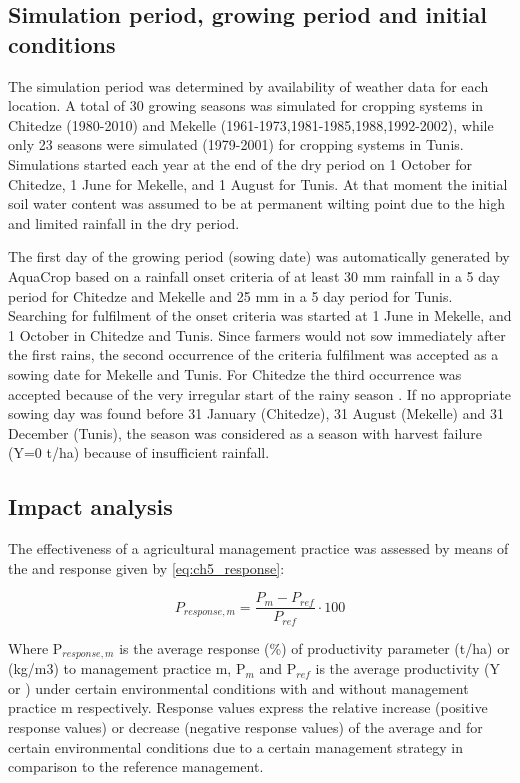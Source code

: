 \subsection{Simulation period, growing period and initial conditions}
The simulation period was determined by availability of weather data for each location. A total of 30 growing seasons was simulated for cropping systems in Chitedze (1980-2010) and Mekelle (1961-1973,1981-1985,1988,1992-2002), while only 23 seasons were simulated (1979-2001) for cropping systems in Tunis. Simulations started each year at the end of the dry period on 1 October for Chitedze, 1 June for Mekelle, and 1 August for Tunis. At that moment the initial soil water content was assumed to be at permanent wilting point due to the high \ETo and limited rainfall in the dry period.

The first day of the growing period (sowing date) was automatically generated by AquaCrop based on a rainfall onset criteria of at least 30 mm rainfall in a 5 day period for Chitedze and Mekelle and 25 mm in a 5 day period for Tunis. Searching for fulfilment of the onset criteria was started at 1 June in Mekelle, and 1 October in Chitedze and Tunis. Since farmers would not sow immediately after the first rains, the second occurrence of the criteria fulfilment was accepted as a sowing date for Mekelle and Tunis. For Chitedze the third occurrence was accepted because of the very irregular start of the rainy season \parencite{scroyen2012}. If no appropriate sowing day was found before 31 January (Chitedze), 31 August (Mekelle) and 31 December (Tunis), the season was considered as a season with harvest failure (Y=0 t/ha) because of insufficient rainfall. 

\subsection{Impact analysis}
The effectiveness of a agricultural management practice was assessed by means of the \Y and \WPET response given by \autoref{eq:ch5_response}: 

\begin{equation}
 P_{response,m}=\dfrac{P_m-P_{ref}}{P_{ref}}\cdot 100
  \label{eq:ch5_response}
\end{equation}

Where P$_{response,m}$ is the average response (\%) of productivity parameter \Y (t/ha) or \WPET (kg/m3) to management practice m, P$_m$ and P$_{ref}$ is the average productivity (Y or \WPET) under certain environmental conditions with and without management practice m respectively. Response values express the relative increase (positive response values) or decrease (negative response values) of the average \Y and \WPET for certain environmental conditions due to a certain management strategy in comparison to the reference management. 

